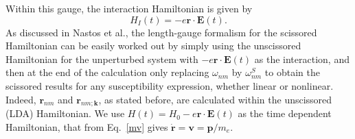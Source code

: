 \documentclass[floatfix,prb,aps,superscriptaddress,11pt]{revtex4}
\begin{document}
Within this gauge, the interaction Hamiltonian is given by 
\begin{equation}
H_{I}(t)=-e\mathbf{r}\cdot \mathbf{E}(t).  \label{rde}
\end{equation}
As discussed in Nastos et al.\cite{nastosPRB05}, the
length-gauge formalism for the scissored Hamiltonian can be easily worked
out by simply using the unscissored Hamiltonian for the unperturbed system
with $-e\mathbf{r}\cdot \mathbf{E}(t)$ as the interaction, and then at the end of the
calculation only replacing $\omega_{nm}$ by $\omega_{nm}^{S}$ to obtain the
scissored results for any susceptibility expression, whether linear or
nonlinear. Indeed, $\mathbf{r}_{nm}$ and $\mathbf{r}_{nm;\mathbf{k}}$, as stated before, are
calculated within the unscissored (LDA) Hamiltonian. We use 
$
H(t)=H_{0}-e\mathbf{r}\cdot \mathbf{E}(t)  \label{hamlong}
$
as the time dependent Hamiltonian, that from Eq.~\eqref{mv} gives
$\dot{\mathbf{r}}=\mathbf{v}=\mathbf{p}/m_e$.
\end{document}
